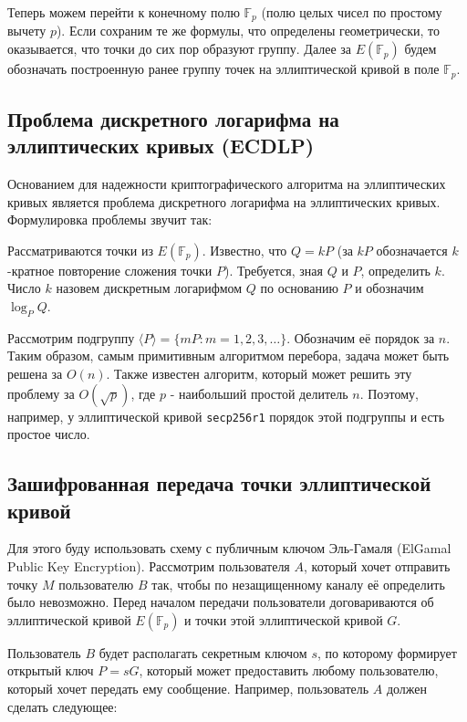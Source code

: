 Теперь можем перейти к конечному полю $\mathbb F_p$ (полю целых чисел по простому вычету $p$). Если сохраним те же формулы, что определены геометрически, то оказывается, что точки до сих пор образуют группу. Далее за $E(\mathbb F_p)$ будем обозначать построенную ранее группу точек на эллиптической кривой в поле $\mathbb F_p$.

\subsection{Проблема дискретного логарифма на эллиптических кривых (ECDLP)}

Основанием для надежности криптографического алгоритма на эллиптических кривых является проблема дискретного логарифма на эллиптических кривых. Формулировка проблемы звучит так:

\begin{tcolorbox}[title=Elliptic Curve Discrete Logarithm Problem]
	Рассматриваются точки из $E(\mathbb F_p)$. Известно, что $Q=kP$ (за $kP$ обозначается $k$-кратное повторение сложения точки $P$). Требуется, зная $Q$ и $P$, определить $k$. Число $k$ назовем дискретным логарифмом $Q$ по основанию $P$ и обозначим $\log_PQ$.
\end{tcolorbox}

Рассмотрим подгруппу $\langle P \rangle = \{mP: m=1,2,3,\dots\}$. Обозначим её порядок за $n$. Таким образом, самым примитивным алгоритмом перебора, задача может быть решена за $O(n)$. Также известен алгоритм, который может решить эту проблему за $O(\sqrt p)$, где $p$ - наибольший простой делитель $n$. Поэтому, например, у эллиптической кривой \texttt{secp256r1} порядок этой подгруппы и есть простое число.

\subsection{Зашифрованная передача точки эллиптической кривой}

Для этого буду использовать схему с публичным ключом Эль-Гамаля (ElGamal Public Key Encryption). Рассмотрим пользователя $A$, который хочет отправить точку $M$ пользователю $B$ так, чтобы по незащищенному каналу её определить было невозможно. Перед началом передачи пользователи договариваются об эллиптической кривой $E(\mathbb F_p)$ и точки этой эллиптической кривой $G$.

Пользователь $B$ будет располагать секретным ключом $s$, по которому формирует открытый ключ $P=sG$, который может предоставить любому пользователю, который хочет передать ему сообщение. Например, пользователь $A$ должен сделать следующее:

